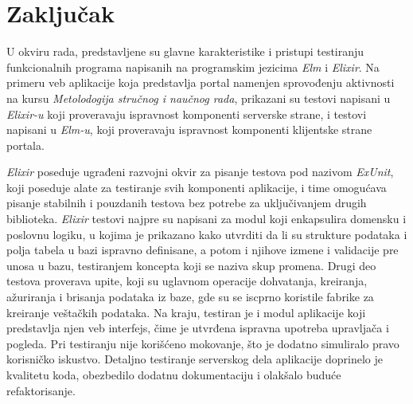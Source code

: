 \documentclass[12pt,oneside]{memoir}
\begin{document}



\chapter{Zaključak}
\par U okviru rada, predstavljene su glavne karakteristike i pristupi testiranju funkcionalnih programa napisanih na programskim jezicima \emph{Elm} i \emph{Elixir}. Na primeru veb aplikacije koja predstavlja portal namenjen sprovođenju aktivnosti na kursu \emph{Metolodogija stručnog i naučnog rada}, prikazani su testovi napisani u \emph{Elixir-u} koji proveravaju ispravnost komponenti serverske strane, i testovi napisani u \emph{Elm-u}, koji proveravaju ispravnost komponenti klijentske strane portala.
\par \emph{Elixir} poseduje ugrađeni razvojni okvir za pisanje testova pod nazivom \emph{ExUnit}, koji poseduje alate za testiranje svih komponenti aplikacije, i time omogućava pisanje stabilnih i pouzdanih testova bez potrebe za uključivanjem drugih biblioteka. \emph{Elixir} testovi najpre su napisani za modul koji enkapsulira domensku i poslovnu logiku, u kojima je prikazano kako utvrditi da li su strukture podataka i polja tabela u bazi ispravno definisane, a potom i njihove izmene i validacije pre unosa u bazu, testiranjem koncepta koji se naziva skup promena. Drugi deo testova proverava upite, koji su uglavnom operacije dohvatanja, kreiranja, ažuriranja i brisanja podataka iz baze, gde su se iscprno koristile fabrike za kreiranje veštačkih podataka. Na kraju, testiran je i modul aplikacije koji predstavlja njen veb interfejs, čime je utvrđena ispravna upotreba upravljača i pogleda. Pri testiranju nije korišćeno mokovanje, što je dodatno simuliralo pravo korisničko iskustvo. Detaljno testiranje serverskog dela aplikacije doprinelo je kvalitetu koda, obezbedilo dodatnu dokumentaciju i olakšalo buduće refaktorisanje.
\end{document}
